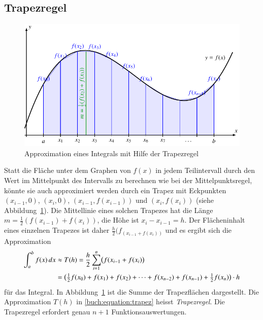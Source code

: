 \subsection{Trapezregel
\label{buch:subsection:trapez}}
%
\begin{figure}
\centering
\includegraphics{chapters/40-integration/figures/trapez.pdf}
\caption{Approximation eines Integrals mit Hilfe der Trapezregel
\label{buch:figure:trapez}}
\end{figure}
Statt die Fläche unter dem Graphen von $f(x)$ in jedem Teilintervall
durch den Wert im Mittelpunkt des Intervalls zu berechnen wie bei der
Mittelpunktsregel, könnte sie auch approximiert werden durch ein
Trapez mit Eckpunkten $(x_{i-1},0)$, $(x_i,0)$,
$(x_{i-1},f(x_{i-1}))$ und
$(x_i,f(x_i))$ (siehe Abbildung~\ref{buch:figure:trapez}).
Die Mittellinie eines solchen Trapezes hat die Länge
$m=\frac12(f(x_{i-1}) +f(x_i))$, die Höhe ist $x_i-x_{i-1}=h$.
%
%
Der Flächeninhalt eines einzelnen Trapezes ist daher
$\frac{h}2(f_(x_{i-1}+f(x_i))$ und es ergibt sich die Approximation
\begin{align}
\int_a^b
f(x)\,dx
&\approx
T(h)
=
\frac{h}2
\sum_{i=1}^n \bigl(f(x_{i-1} + f(x_i)\bigr)
\notag
\\
&=
\bigl(
{\textstyle\frac12}f(x_0) + f(x_1) + f(x_2)
+ \dots
+ f(x_{n-2}) + f(x_{n-1}) + {\textstyle\frac12} f(x_n)
\bigr)\cdot h
\label{buch:equation:trapez}
\end{align}
für das Integral.
In Abbildung~\ref{buch:figure:trapez} ist die Summe der Trapezflächen 
dargestellt.
Die Approximation $T(h)$ in \eqref{buch:equation:trapez} heisst
{\em Trapezregel}.
%
Die Trapezregel erfordert genau $n+1$ Funktionsauswertungen.

